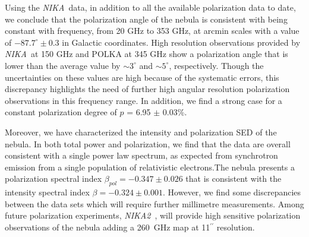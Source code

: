 \documentclass[twocolumn,traditabstract]{aa}
\def\NIKA{\textit{NIKA}}
\def\NIKAd{\textit{NIKA2}}
\begin{document}
Using the \NIKA\ data, in addition to all the available polarization data to date, we conclude that the
polarization angle of the  nebula is consistent with being constant with
frequency, from 20 GHz to 353 GHz, at arcmin scales with a value of
$-87.7^{\circ}\pm0.3$ in Galactic coordinates. High resolution observations provided by \NIKA\ at 150 GHz and POLKA at 345 GHz show a polarization angle that is lower than the average value by $\sim 3^{\circ}$ and $\sim 5^{\circ}$, respectively.
Though the uncertainties on these values are high because of the systematic errors, this discrepancy highlights the need of further high angular resolution polarization observations in this frequency range.
In addition, we find a strong case for a constant polarization degree of $p$ = 6.95 $\pm$ 0.03\%. 

Moreover, we have characterized the intensity and polarization SED of the  nebula. In both total power and polarization, we find that the data are overall consistent with a single power law spectrum, as expected from synchrotron emission from a single population of relativistic electrons.The  nebula presents a polarization spectral index $\beta_{pol}=-0.347 \pm 0.026$ that is consistent with the intensity spectral index $\beta=-0.324 \pm 0.001$. 
However, we find some discrepancies between the  data sets which will require further millimetre measurements. Among future polarization experiments, \NIKAd\ \citep{calvo2016,2017arXiv170700908A}, will provide high sensitive polarization observations of the  nebula adding a 260~GHz map at 11$^{\prime\prime}$ resolution.


\end{document}
